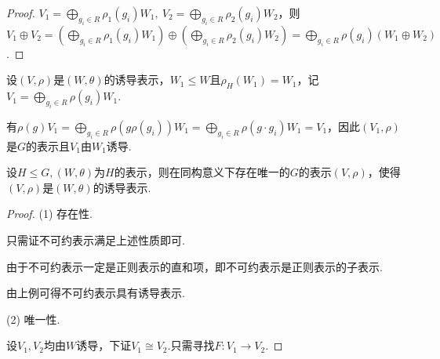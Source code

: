 \begin{proof}
    $V_1 = \bigoplus_{g_i \in R} \rho_1(g_i) W_1,\ V_2 = \bigoplus_{g_i \in R} \rho_2(g_i) W_2$，则$V_1 \oplus V_2 = (\bigoplus_{g_i \in R} \rho_1(g_i) W_1) \oplus (\bigoplus_{g_i \in R} \rho_2(g_i) W_2) = \bigoplus_{g_i \in R} \rho(g_i) (W_1 \oplus W_2)$.
\end{proof}

\begin{instance}
    设$(V, \rho)$是$(W, \theta)$的诱导表示，$W_1 \leqslant W$且$\rho_H(W_1) = W_1$，记$V_1 = \bigoplus_{g_i \in R} \rho(g_i) W_1$.\par
    有$\rho(g)V_1 = \bigoplus_{g_i \in R} \rho(g\rho(g_i)) W_1 = \bigoplus_{g_i \in R} \rho(g \cdot g_i) W_1 = V_1$，因此$(V_1, \rho)$是$G$的表示且$V_1$由$W_1$诱导.
\end{instance} 

\begin{theorem}[]
    设$H \leqslant G, (W, \theta)$为$H$的表示，则在同构意义下存在唯一的$G$的表示$(V, \rho)$，使得$(V, \rho)$是$(W, \theta)$的诱导表示.
\end{theorem}

\begin{proof}
    (1) 存在性.\par
    只需证不可约表示满足上述性质即可.\par
    由于不可约表示一定是正则表示的直和项，即不可约表示是正则表示的子表示.\par
    由上例可得不可约表示具有诱导表示.\par
    (2) 唯一性.\par
    设$V_1, V_2$均由$W$诱导，下证$V_1 \cong V_2$.只需寻找\ghomo $F: V_1 \to V_2$.
\end{proof}

